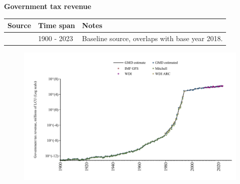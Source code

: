 \documentclass[12pt,a4paper,landscape]{article}
\begin{document}
\begin{adjustbox}{max totalsize={\paperwidth}{\paperheight},center}
\begin{minipage}[t][\textheight][t]{\textwidth}
\vspace*{0.5cm}
{}
\begin{center}
{\Large\bfseries Government tax revenue}
\end{center}
\vspace{0.5cm}
\begin{table}[H]
\centering
\small
\begin{tabular}{|l|l|l|}
\hline
\textbf{Source} & \textbf{Time span} & \textbf{Notes} \\
\hline
\rowcolor{white}\cite{GMD_estimated}& 1900 - 2023 &Baseline source, overlaps with base year 2018. \\
\hline
\end{tabular}
\end{table}
\begin{figure}[H]
\centering
\includegraphics[width=\textwidth,height=0.6\textheight,keepaspectratio]{graphs/BRA_govtax.pdf}
\end{figure}
\end{minipage}
\end{adjustbox}
\end{document}
